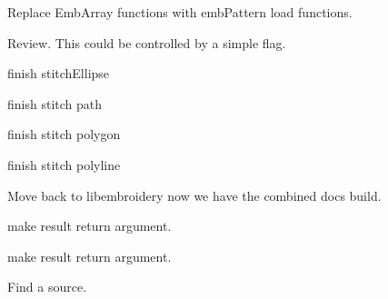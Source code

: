 \begin{DoxyRefList}
\label{todo__todo000178}%
%
Replace Emb\+Array functions with emb\+Pattern load functions. 
\item[Member \mbox{\hyperlink{geometry_8c_ae6461f57f08ce5992c70fa9897988644}{emb\+Geometry\+\_\+vulcanize}} (Emb\+Geometry $\ast$obj)]\label{todo__todo000203}%
%
Review. This could be controlled by a simple flag.  
\item[Member \mbox{\hyperlink{fill_8c_a63bc84e4406e59c092a2e076afedf930}{emb\+Pattern\+\_\+stitch\+Ellipse}} (Emb\+Pattern $\ast$p, Emb\+Ellipse ellipse, int thread\+\_\+index, int style)]\label{todo__todo000189}%
%
finish stitch\+Ellipse  
\item[Member \mbox{\hyperlink{fill_8c_a736fce5df010bbe74ea9ad2857be9bf4}{emb\+Pattern\+\_\+stitch\+Path}} (Emb\+Pattern $\ast$p, Emb\+Path path, int thread\+\_\+index, int style)]\label{todo__todo000190}%
%
finish stitch path  
\item[Member \mbox{\hyperlink{fill_8c_a86f903495c0da7514294200680bd6414}{emb\+Pattern\+\_\+stitch\+Polygon}} (Emb\+Pattern $\ast$p, Emb\+Polygon polygon, int thread\+\_\+index, int style)]\label{todo__todo000191}%
%
finish stitch polygon  
\item[Member \mbox{\hyperlink{fill_8c_a9ae9d5d7dfbb2ab361dc37970b7eb2f2}{emb\+Pattern\+\_\+stitch\+Polyline}} (Emb\+Pattern $\ast$p, Emb\+Polyline polyline, int thread\+\_\+index, int style)]\label{todo__todo000192}%
%
finish stitch polyline  
\item[Page \mbox{\hyperlink{md_extern_libembroidery_src_embroider_cli}{embroider\+\_\+cli}} ]\label{todo__todo000181}%
%
Move back to libembroidery now we have the combined docs build. 
\item[Member \mbox{\hyperlink{vector_8c_a0a4af07bfac410623cf77a35a11550b1}{emb\+Vector\+\_\+multiply}} (Emb\+Vector vector, Emb\+Real magnitude, Emb\+Vector $\ast$result)]\label{todo__todo000214}%
%
make result return argument.  
\item[Member \mbox{\hyperlink{vector_8c_aaad72d90c58592e330de08139aee5077}{emb\+Vector\+\_\+normalize}} (Emb\+Vector vector, Emb\+Vector $\ast$result)]\label{todo__todo000213}%
%
make result return argument.  
\item[Page \mbox{\hyperlink{md_extern_libembroidery_src_formats_formats}{Formats}} ]\label{todo__todo000217}%
%
Find a source.


\end{DoxyRefList}
